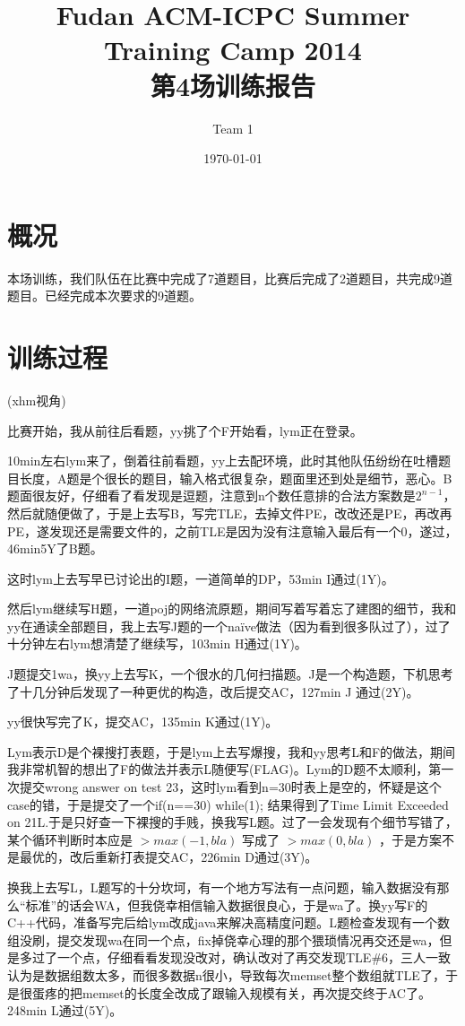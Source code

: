 \documentclass[a4paper, 11pt, nofonts, nocap, fancyhdr]{ctexart}
\title{Fudan ACM-ICPC Summer Training Camp 2014\\第4场训练报告}
\author{Team 1}
\date{\today}
\begin{document}
\maketitle

\section{概况}

本场训练，我们队伍在比赛中完成了7道题目，比赛后完成了2道题目，共完成9道题目。已经完成本次要求的9道题。


\section{训练过程}


(xhm视角)

比赛开始，我从前往后看题，yy挑了个F开始看，lym正在登录。

10min左右lym来了，倒着往前看题，yy上去配环境，此时其他队伍纷纷在吐槽题目长度，A题是个很长的题目，输入格式很复杂，题面里还到处是细节，恶心。B题面很友好，仔细看了看发现是逗题，注意到n个数任意排的合法方案数是$2^{n-1}$，然后就随便做了，于是上去写B，写完TLE，去掉文件PE，改改还是PE，再改再PE，遂发现还是需要文件的，之前TLE是因为没有注意输入最后有一个0，遂过，46min5Y了B题。

这时lym上去写早已讨论出的I题，一道简单的DP，53min I通过(1Y)。

然后lym继续写H题，一道poj的网络流原题，期间写着写着忘了建图的细节，我和yy在通读全部题目，我上去写J题的一个naïve做法（因为看到很多队过了），过了十分钟左右lym想清楚了继续写，103min H通过(1Y)。

J题提交1wa，换yy上去写K，一个很水的几何扫描题。J是一个构造题，下机思考了十几分钟后发现了一种更优的构造，改后提交AC，127min J 通过(2Y)。

yy很快写完了K，提交AC，135min K通过(1Y)。

Lym表示D是个裸搜打表题，于是lym上去写爆搜，我和yy思考L和F的做法，期间我非常机智的想出了F的做法并表示L随便写(FLAG)。Lym的D题不太顺利，第一次提交wrong answer on test 23，这时lym看到n=30时表上是空的，怀疑是这个case的错，于是提交了一个if(n==30) while(1); 结果得到了Time Limit Exceeded on 21L.于是只好查一下裸搜的手贱，换我写L题。过了一会发现有个细节写错了，某个循环判断时本应是 $> max(-1, bla)$ 写成了 $ > max(0, bla) $ ，于是方案不是最优的，改后重新打表提交AC，226min D通过(3Y)。

换我上去写L，L题写的十分坎坷，有一个地方写法有一点问题，输入数据没有那么“标准”的话会WA，但我侥幸相信输入数据很良心，于是wa了。换yy写F的C++代码，准备写完后给lym改成java来解决高精度问题。L题检查发现有一个数组没刷，提交发现wa在同一个点，fix掉侥幸心理的那个猥琐情况再交还是wa，但是多过了一个点，仔细看看发现没改对，确认改对了再交发现TLE\#6，三人一致认为是数据组数太多，而很多数据n很小，导致每次memset整个数组就TLE了，于是很蛋疼的把memset的长度全改成了跟输入规模有关，再次提交终于AC了。248min L通过(5Y)。
\end{document}
